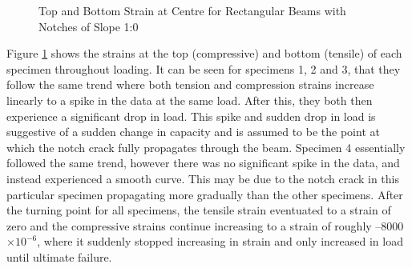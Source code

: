 \documentclass[11pt,a4paper]{article}
\numberwithin{equation}{subsection}
\begin{document}
\begin{figure}[h]
	\begin{center}
	\end{center}
	\caption{Top and Bottom Strain at Centre for Rectangular Beams with Notches of Slope 1:0}
	\label{fig:Rect_10_centre}
\end{figure}

\pagebreak

\noindent
Figure \ref{fig:Rect_10_centre} shows the strains at the top (compressive) and bottom (tensile) of each specimen throughout loading. It can be seen for specimens 1, 2 and 3, that they follow the same trend where both tension and compression strains increase linearly to a spike in the data at the same load. After this, they both then experience a significant drop in load. This spike and sudden drop in load is suggestive of a sudden change in capacity and is assumed to be the point at which the notch crack fully propagates through the beam. Specimen 4 essentially followed the same trend, however there was no significant spike in the data, and instead experienced a smooth curve. This may be due to the notch crack in this particular specimen propagating more gradually than the other specimens. After the turning point for all specimens, the tensile strain eventuated to a strain of zero and the compressive strains continue increasing to a strain of roughly --8000 $\times 10^{-6}$, where it suddenly stopped increasing in strain and only increased in load until ultimate failure.  
\end{document}
